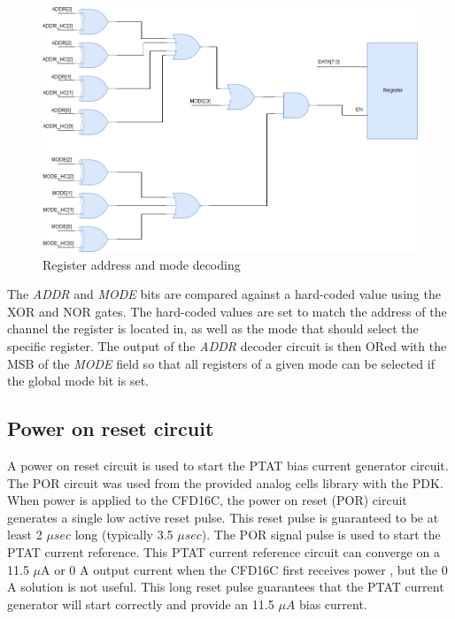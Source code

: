 \documentclass[12pt,oneside,final]{siuethesis}
\theoremstyle{definition}
\begin{document}
\begin{figure}[htbp!]
 \centering
 \includegraphics[scale=.45,keepaspectratio=true]{./ch3_figures/Register.png}
 \caption{Register address and mode decoding}
 \label{fig:register}
\end{figure}

\par The \emph{ADDR} and \emph{MODE} bits are compared against a hard-coded value using the XOR and NOR gates. The hard-coded values are set to match the address of the channel the register is located in, as well as the mode that should select the specific register. The output of the \emph{ADDR} decoder circuit is then ORed with the MSB of the \emph{MODE} field so that all registers of a given mode can be selected if the global mode bit is set.

\subsection{Power on reset circuit}
\par A power on reset circuit is used to start the PTAT bias current generator circuit. The POR circuit was used from the provided analog cells library with the PDK. When power is applied to the CFD16C, the power on reset (POR) circuit generates a single low active reset pulse. This reset pulse is guaranteed to be at least 2 $\mu sec$ long (typically 3.5 $\mu sec$). The POR signal pulse is used to start the PTAT current reference. This PTAT current reference circuit can converge on a 11.5 $\mu$A or 0 A output current when the CFD16C first receives power \cite{ALAN_BOOK}, but the 0 A solution is not useful. This long reset pulse guarantees that the PTAT current generator will start correctly and provide an 11.5 $\mu A$ bias current.
\end{document}

